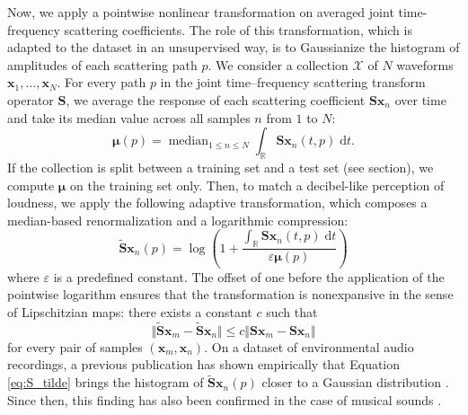 \documentclass{bmcart}
\DeclareMathOperator*{\median}{median}
\newcommand{\lnameref}[1]{%
\bgroup
\let\nmu\MakeLowercase
\nameref{#1}\egroup}
\newcommand{\nmu}{}
\begin{document}
Now, we apply a pointwise nonlinear transformation on averaged joint time-frequency scattering coefficients.
The role of this transformation, which is adapted to the dataset in an unsupervised way, is to Gaussianize the histogram of amplitudes of each scattering path $p$.
We consider a collection $\mathcal{X}$ of $N$ waveforms $\boldsymbol{x}_1,\ldots,\boldsymbol{x}_N$. For every path $p$ in the joint time--frequency scattering transform operator $\mathbf{S}$, we average the response of each scattering coefficient $\mathbf{S}\boldsymbol{x}_n$ over time and take its median value across all samples $n$ from $1$ to $N$:
\begin{equation}
\boldsymbol{\mu}(p) =
\median_{1\leq n \leq N}
\int_{\mathbb{R}} \mathbf{S}\boldsymbol{x}_n(t, p) \;\mathrm{d}t.
\end{equation}
If the collection is split between a training set and a test set (see \lnameref{sec:results} section), we compute $\boldsymbol{\mu}$ on the training set only.
Then, to match a decibel-like perception of loudness, we apply the following adaptive transformation, which composes a median-based renormalization and a logarithmic compression:
\begin{equation}
\mathbf{\widetilde{S}}\boldsymbol{x}_n (p) =
\log \left(
1 +
\dfrac{
\int_\mathbb{R} \mathbf{S}\boldsymbol{x}_n (t, p) \;\mathrm{d}t
}{\varepsilon\boldsymbol{\mu}(p)}
\right)
\label{eq:S_tilde}
\end{equation}
where $\varepsilon$ is a predefined constant.
The offset of one before the application of the pointwise logarithm ensures that the transformation is nonexpansive in the sense of Lipschitzian maps: there exists a constant $c$ such that
\begin{equation}
\big \Vert
\mathbf{\widetilde{S}}\boldsymbol{x}_m
-
\mathbf{\widetilde{S}}\boldsymbol{x}_{n}
\big \Vert
\leq
c
\big \Vert
\mathbf{S}\boldsymbol{x}_m
-
\mathbf{S}\boldsymbol{x}_{n}
\big \Vert
\end{equation}
for every pair of samples $(\boldsymbol{x}_m, \boldsymbol{x}_n)$.
On a dataset of environmental audio recordings, a previous publication has shown empirically that Equation \ref{eq:S_tilde} brings the histogram of $\mathbf{\widetilde{S}}\boldsymbol{x}_n (p)$ closer to a Gaussian distribution \cite{lostanlen2018jasmp}.
Since then, this finding has also been confirmed in the case of musical sounds \cite{lostanlen2018extended}.
\end{document}
